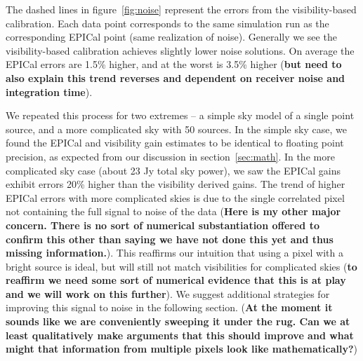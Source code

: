 \documentclass[a4paper,fleqn,usenatbib]{../mnras}
\begin{document}
The dashed lines in figure~\ref{fig:noise} represent the errors from the visibility-based calibration. Each data point corresponds to the same simulation run as the corresponding EPICal point (same realization of noise). Generally we see the visibility-based calibration achieves slightly lower noise solutions. On average the EPICal errors are 1.5\% higher, and at the worst is 3.5\% higher ({\bf but need to also explain this trend reverses and dependent on receiver noise and integration time}). 

We repeated this process for two extremes -- a simple sky model of a single point source, and a more complicated sky with 50 sources. In the simple sky case, we found the EPICal and visibility gain estimates to be identical to floating point precision, as expected from our discussion in section~\ref{sec:math}. In the more complicated sky case (about 23 Jy total sky power), we saw the EPICal gains exhibit errors 20\% higher than the visibility derived gains. The trend of higher EPICal errors with more complicated skies is due to the single correlated pixel not containing the full signal to noise of the data ({\bf Here is my other major concern. There is no sort of numerical substantiation offered to confirm this other than saying we have not done this yet and thus missing information.}). This reaffirms our intuition that using a pixel with a bright source is ideal, but will still not match visibilities for complicated skies ({\bf to reaffirm we need some sort of numerical evidence that this is at play and we will work on this further}). We suggest additional strategies for improving this signal to noise in the following section. ({\bf At the moment it sounds like we are conveniently sweeping it under the rug. Can we at least qualitatively make arguments that this should improve and what might that information from multiple pixels look like mathematically?})
\end{document}
